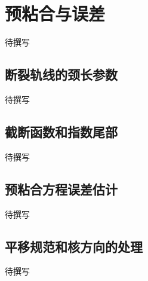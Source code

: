 
% 
% 

\section{预粘合与误差}
\label{g4:sec:2602}

待撰写

\subsection{断裂轨线的颈长参数}
\label{g4:subsec:2602:01}
待撰写

\subsection{截断函数和指数尾部}
\label{g4:subsec:2602:02}
待撰写

\subsection{预粘合方程误差估计}
\label{g4:subsec:2602:03}
待撰写

\subsection{平移规范和核方向的处理}
\label{g4:subsec:2602:04}
待撰写
